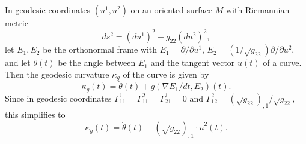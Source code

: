 In geodesic coordinates $(u^1, u^2)$ on an oriented surface $M$ with Riemannian metric
$$ds^2 = (du^1)^2 + g_{22}(du^2)^2,$$
let $E_1, E_2$ be the orthonormal frame with $E_1 = \partial/\partial u^1$, $E_2 = (1/\sqrt{g_{22}}) \partial/\partial u^2$, and let $\theta(t)$ be the angle between $E_1$ and the tangent vector $\dot{u}(t)$ of a curve. Then the geodesic curvature $\kappa_g$ of the curve is given by
$$\kappa_g(t) = \dot{\theta}(t) + g(\nabla E_1/dt, E_2)(t).$$
Since in geodesic coordinates $\Gamma_{11}^1 = \Gamma_{11}^2 = \Gamma_{21}^1 = 0$ and $\Gamma_{12}^2 = (\sqrt{g_{22}})_{,1}/\sqrt{g_{22}}$, this simplifies to
$$\kappa_g(t) = \dot{\theta}(t) - (\sqrt{g_{22}})_{,1} \cdot \dot{u}^2(t).$$
